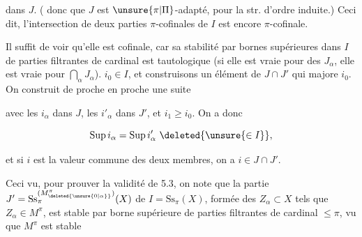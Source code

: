 
dans $J$. (  donc que $J$ est  $\unsure{\pi|\Pi}$-adapté, pour la str. d'ordre induite.) Ceci dit,  l'intersection de deux parties $\pi$-cofinales de $I$ est encore $\pi$-cofinale.

Il suffit de voir qu'elle est cofinale, car sa stabilité par bornes supérieures dans $I$ de parties filtrantes de cardinal est tautologique (si elle est vraie pour des $J_\alpha$, elle est vraie pour $\bigcap_\alpha J_\alpha$).   $i_0\in I$,  et construisons un élément de $J\cap J'$ qui  majore $i_0$.  On construit de proche en proche une  suite


avec les $i_\alpha$ dans $J$, les $i'_\alpha$ dans $J'$, et $i_1\geq i_0$.  On a donc

\[
\mathrm{Sup}\,i_\alpha=\mathrm{Sup}\,i'_\alpha\ \deleted{\unsure{\in I}},
\]

et si $i$ est la valeur commune des deux membres, on a $i\in J\cap J'$.

Ceci vu, pour prouver la validité de 5.3, on note que la partie $J'=\mathrm{Ss}^{(M^{\pi}_{\deleted{\unsure{0|\alpha}}})}_{\pi}(X)$ de $I=\mathrm{Ss}_\pi(X)$, formée des $Z_\alpha\subset X$ tels que $Z_\alpha\in M^\pi$, est stable par borne supérieure de parties filtrantes de cardinal $\leq\pi$, vu que $M^\pi$ est stable

